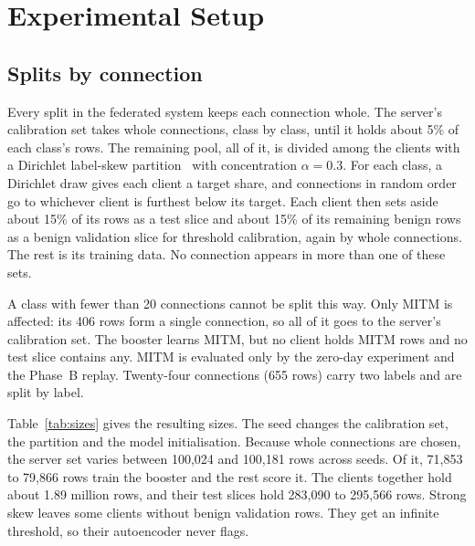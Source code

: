\section{Experimental Setup}
\label{sec:setup}
\subsection{Splits by connection}
\label{sec:splits}
Every split in the federated system keeps each connection whole. The server's calibration set takes whole connections, class by class, until it holds about 5\% of each class's rows. The remaining pool, all of it, is divided among the clients with a Dirichlet label-skew partition~\cite{hsu2019} with concentration $\alpha=0.3$. For each class, a Dirichlet draw gives each client a target share, and connections in random order go to whichever client is furthest below its target. Each client then sets aside about 15\% of its rows as a test slice and about 15\% of its remaining benign rows as a benign validation slice for threshold calibration, again by whole connections. The rest is its training data. No connection appears in more than one of these sets.

A class with fewer than 20 connections cannot be split this way. Only MITM is affected: its 406 rows form a single connection, so all of it goes to the server's calibration set. The booster learns MITM, but no client holds MITM rows and no test slice contains any. MITM is evaluated only by the zero-day experiment and the Phase~B replay. Twenty-four connections (655 rows) carry two labels and are split by label.

Table~\ref{tab:sizes} gives the resulting sizes. The seed changes the calibration set, the partition and the model initialisation. Because whole connections are chosen, the server set varies between 100,024 and 100,181 rows across seeds. Of it, 71,853 to 79,866 rows train the booster and the rest score it. The clients together hold about 1.89 million rows, and their test slices hold 283,090 to 295,566 rows. Strong skew leaves some clients without benign validation rows. They get an infinite threshold, so their autoencoder never flags.

